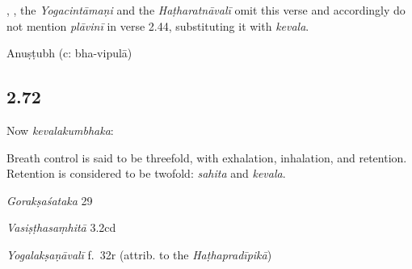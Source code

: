 \begin{ekdosis}
\begin{philcomm}[hp02_071]
, , the \emph{Yogacintāmaṇi} and the \emph{Haṭharatnāvalī} omit this verse and accordingly do not mention \emph{plāvinī} in verse 2.44, substituting it with \emph{kevala}.

\end{philcomm}

\begin{metre}[hp02_071]
Anuṣṭubh (c: bha-vipulā)
\end{metre}

\subsection*{2.72}
\begin{translation}[hp02_072]
Now \emph{kevalakumbhaka}:

Breath control is said to be threefold, with exhalation, inhalation, and retention. Retention is considered to be twofold: \emph{sahita} and \emph{kevala}.

\end{translation}

\begin{sources}[hp02_072]
\emph{Gorakṣaśataka} 29

\begin{versinnote}
\end{versinnote}

\emph{Vasiṣṭhasaṃhitā} 3.2cd

\begin{versinnote}
\end{versinnote}
\end{sources}

\begin{testimonia}[hp02_072]
\emph{Yogalakṣaṇāvalī} f.~32r (attrib. to the \emph{Haṭhapradīpikā})
\begin{versinnote}
\end{versinnote}


\end{testimonia}
\end{ekdosis}
